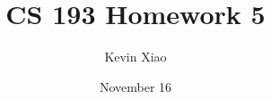 \documentclass{article}
\title{CS 193 Homework 5}
\author{Kevin Xiao}
\date{November 16}
\begin{document}
\maketitle{}



\end{document}
